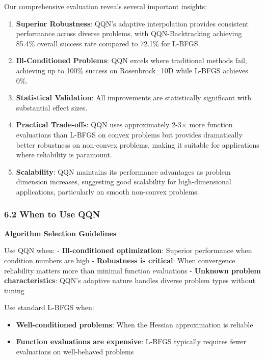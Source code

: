 Our comprehensive evaluation reveals several important insights:

\begin{enumerate}
\def\labelenumi{\arabic{enumi}.}
\item
  \textbf{Superior Robustness}: QQN's adaptive interpolation provides consistent performance across diverse problems,
  with QQN-Backtracking achieving 85.4\% overall success rate compared to 72.1\% for L-BFGS.
\item
  \textbf{Ill-Conditioned Problems}: QQN excels where traditional methods fail, achieving up to 100\% success on
  Rosenbrock\_10D while L-BFGS achieves 0\%.
\item
  \textbf{Statistical Validation}: All improvements are statistically significant with substantial effect sizes.
\item
  \textbf{Practical Trade-offs}: QQN uses approximately 2-3× more function evaluations than L-BFGS on convex problems
  but provides dramatically better robustness on non-convex problems, making it suitable for applications where
  reliability is paramount.
\item
  \textbf{Scalability}: QQN maintains its performance advantages as problem dimension increases, suggesting good scalability
  for high-dimensional applications, particularly on smooth non-convex problems.
\end{enumerate}

\hypertarget{when-to-use-qqn}{%
\subsubsection{6.2 When to Use QQN}\label{when-to-use-qqn}}

\textbf{Algorithm Selection Guidelines}

Use QQN when:
- \textbf{Ill-conditioned optimization}: Superior performance when condition numbers are high
- \textbf{Robustness is critical}: When convergence reliability matters more than minimal function evaluations
- \textbf{Unknown problem characteristics}: QQN's adaptive nature handles diverse problem types without tuning

Use standard L-BFGS when:

\begin{itemize}
\tightlist
\item
  \textbf{Well-conditioned problems}: When the Hessian approximation is reliable
\item
  \textbf{Function evaluations are expensive}: L-BFGS typically requires fewer evaluations on well-behaved problems
\end{itemize}


